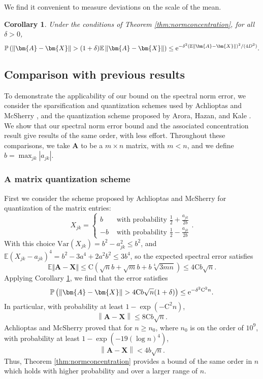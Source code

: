 \documentclass[11pt,letterpaper,twoside,reqno]{amsart}
\newcommand{\e}{\ensuremath{{\rm e}}}
\newcommand{\mat}[1]{\ensuremath{\bm{#1}}}
\newcommand{\E}{\ensuremath{\mathbb{E}}}
\newcommand{\Prob}[1]{\ensuremath{\mathbb{P}\left(#1\right)}}
\newcommand{\norm}[1]{\ensuremath{\left\|#1\right\|}}
\newcommand{\var}[1]{\ensuremath{\mathrm{Var}(#1)}}
\newtheorem{cor}{Corollary}
\begin{document}
We find it convenient to measure deviations on the scale of the mean.
\begin{cor}
Under the conditions of Theorem \ref{thm:normconcentration}, for all $\delta>0$, 
\[
\Prob{\norm{\mat{A}-\mat{X}}>(1+\delta)\mathbb{E}\norm{\mat{A}-\mat{X}}}\leq \e^{-\delta^{2}\left(\mathbb{E}\norm{\mat{A}-\mat{X}}\right)^{2}/(4D^{2})}.
\]
\label{cor:devbnd}
\end{cor}

\subsection{Comparison with previous results}

To demonstrate the applicability of our bound on the spectral norm error, we consider the sparsification and quantization schemes used by Achlioptas and McSherry \cite{AM07}, and the quantization scheme proposed by Arora, Hazan, and Kale \cite{AHK06}. We show that our spectral norm error bound and the associated concentration result give results of the same order, with less effort. Throughout these comparisons, we take $\mat{A}$ to be a $m\times n$ matrix, with $m<n$, and we define $b=\max_{jk}|a_{jk}|$.


\subsubsection{A matrix quantization scheme}

First we consider the scheme proposed by Achlioptas and McSherry for
quantization of the matrix entries: 
\[
X_{jk}=\begin{cases}
b & \text{ with probability }\frac{1}{2}+\frac{a_{jk}}{2b}\\
-b & \text{ with probability }\frac{1}{2}-\frac{a_{jk}}{2b}\end{cases}.
\]
With this choice $\var{X_{jk}}=b^{2}-a_{jk}^{2}\leq b^{2}$, and $\E(X_{jk}-a_{jk})^{4}=b^{2}-3a^{4}+2a^{2}b^{2}\leq3b^{4}$, so the expected spectral error satisfies 
\[
\E\Vert\mat{A}-\mat{X}\Vert\leq \mathrm{C}(\sqrt{n}b+\sqrt{m}b+b\sqrt[4]{3mn})\leq4\mathrm{C}b\sqrt{n}.
\]
Applying Corollary \ref{cor:devbnd}, we find that the error satisfies 
\[
\Prob{\norm{\mat{A}-\mat{X}}>4\mathrm{C}b\sqrt{n}(1 + \delta)}\leq \e^{-\delta^{2}\mathrm{C}^{2}n}.
\]
In particular, with probability at least $1-\exp(-\mathrm{C}^{2}n)$,
\[
\norm{\mat{A}-\mat{X}}\leq8\mathrm{C}b\sqrt{n}.
\]
Achlioptas and McSherry proved that for $n\geq n_{0}$, where $n_{0}$ is on the order of $10^{9}$, with probability at least $1-\exp(-19(\log n)^{4})$,
\[
\norm{\mat{A}-\mat{X}}<4b\sqrt{n}.
\]
Thus, Theorem \ref{thm:normconcentration} provides a bound of the same order in $n$ which holds with higher probability and over a larger range of $n$.
\end{document}
